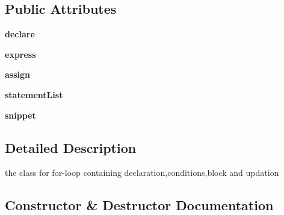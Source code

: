\subsection*{Public Attributes}
\begin{DoxyCompactItemize}
\item 
\mbox{\label{class_parsing_classes_actual_1_1_for_loop_a550adc5c22fce87be47a83598843c706}} 
{\bfseries declare}
\item 
\mbox{\label{class_parsing_classes_actual_1_1_for_loop_a58bbe234e64342924bef0cf9ad5cb9de}} 
{\bfseries express}
\item 
\mbox{\label{class_parsing_classes_actual_1_1_for_loop_abfb0f7260b555ac3390353ba109d5b14}} 
{\bfseries assign}
\item 
\mbox{\label{class_parsing_classes_actual_1_1_for_loop_afc8d391270b2b5c29588b16db8e6d4a1}} 
{\bfseries statement\+List}
\item 
\mbox{\label{class_parsing_classes_actual_1_1_for_loop_abe6e84aef2f75bcfe3d4048271fc312c}} 
{\bfseries snippet}
\end{DoxyCompactItemize}


\subsection{Detailed Description}
the class for for-\/loop containing declaration,conditions,block and updation 

\subsection{Constructor \& Destructor Documentation}
\mbox{\label{class_parsing_classes_actual_1_1_for_loop_a1a97fc2d259b140ef8db3d3d455a286f}} 
